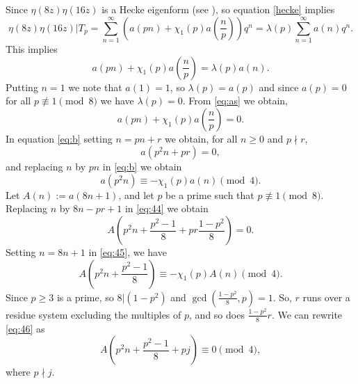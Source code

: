 \documentclass[12pt,reqno]{amsart}
\numberwithin{equation}{section}
\begin{document}
    Since $\eta(8z)\eta(16z)$ is a Hecke eigenform (see \cite[pp. 4854]{Martin}), so equation \eqref{hecke} implies
    \[
    \eta(8z)\eta(16z)|T_p=\sum_{n=1}^\infty \left(a(pn)+\chi_1(p)a\left(\frac{n}{p}\right)\right)q^n=\lambda(p)\sum_{n=1}^\infty a(n)q^n.
    \]
    This implies
    \begin{equation}\label{eq:as}
        a(pn)+\chi_1(p)a\left(\frac{n}{p}\right)=\lambda(p)a(n).
    \end{equation}
    Putting $n=1$ we note that $a(1)=1$, so $\lambda(p)=a(p)$ and since $a(p)=0$ for all $p\not\equiv 1 \pmod 8$ we have $\lambda(p)=0$.
    From \eqref{eq:as} we obtain,
    \begin{equation}\label{eq:b}
        a(pn)+\chi_1(p)a\left(\frac{n}{p}\right)=0.
    \end{equation}
    In equation \eqref{eq:b} setting $n=pn+r$ we obtain, for all $n\geq 0$ and $p\nmid r$,
    \begin{equation}\label{eq:44}
        a(p^2n+pr)=0,
    \end{equation}
    and replacing $n$ by $pn$ in \eqref{eq:b} we obtain
    \begin{equation}\label{eq:45}
        a(p^2n)\equiv -\chi_1(p)a(n) \pmod 4.
    \end{equation}
    Let $A(n):=a(8n+1)$, and let $p$ be a prime such that $p\not\equiv 1\pmod 8$. Replacing $n$ by $8n-pr+1$ in \eqref{eq:44} we obtain
    \begin{equation}\label{eq:46}
        A\left(p^2n+\frac{p^2-1}{8}+pr\frac{1-p^2}{8}\right)=0.
    \end{equation}
    Setting $n=8n+1$ in \eqref{eq:45}, we have
    \begin{equation}\label{eq:47}
   A\left(p^2n+\frac{p^2-1}{8}\right)\equiv -\chi_1(p)A(n) \pmod 4.     
    \end{equation}
    Since $p\geq 3$ is a prime, so $8|(1-p^2)$ and $\gcd\left(\frac{1-p^2}{8},p\right)=1$. So, $r$ runs over a residue system excluding the multiples of $p$, and so does $\frac{1-p^2}{8}r$. We can rewrite \eqref{eq:46} as
    \begin{equation}\label{eq:48}
                A\left(p^2n+\frac{p^2-1}{8}+pj\right)\equiv0 \pmod 4,
    \end{equation}
    where $p\nmid j$.
\end{document}
